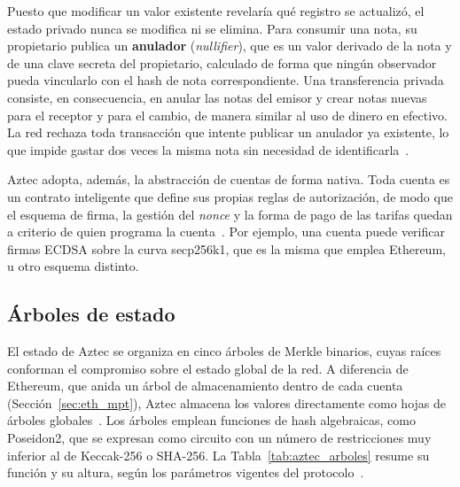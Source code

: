 Puesto que modificar un valor existente revelaría qué registro se actualizó, el estado privado
nunca se modifica ni se elimina. Para consumir una nota, su propietario publica un
\textbf{anulador} (\textit{nullifier}), que es un valor derivado de la nota y de una clave secreta
del propietario, calculado de forma que ningún observador pueda vincularlo con el hash de nota
correspondiente. Una transferencia privada consiste, en consecuencia, en anular las notas del
emisor y crear notas nuevas para el receptor y para el cambio, de manera similar al uso de dinero
en efectivo. La red rechaza toda transacción que intente publicar un anulador ya existente, lo que
impide gastar dos veces la misma nota sin necesidad de identificarla~\cite{aztecstate}.

Aztec adopta, además, la abstracción de cuentas de forma nativa. Toda cuenta es un contrato
inteligente que define sus propias reglas de autorización, de modo que el esquema de firma, la
gestión del \textit{nonce} y la forma de pago de las tarifas quedan a criterio de quien
programa la cuenta~\cite{aztecdocs}. Por ejemplo, una cuenta puede verificar firmas ECDSA sobre la
curva secp256k1, que es la misma que emplea Ethereum, u otro esquema distinto.

\subsection{Árboles de estado}
\label{sec:aztec_arboles}

El estado de Aztec se organiza en cinco árboles de Merkle binarios, cuyas raíces conforman el
compromiso sobre el estado global de la red. A diferencia de Ethereum, que anida un árbol de
almacenamiento dentro de cada cuenta (Sección~\ref{sec:eth_mpt}), Aztec almacena los valores
directamente como hojas de árboles globales~\cite{aztecstate}. Los árboles emplean funciones de
hash algebraicas, como Poseidon2, que se expresan como circuito con un número de restricciones muy
inferior al de Keccak-256 o SHA-256. La Tabla~\ref{tab:aztec_arboles} resume su función y su
altura, según los parámetros vigentes del protocolo~\cite{aztecconstants}.


